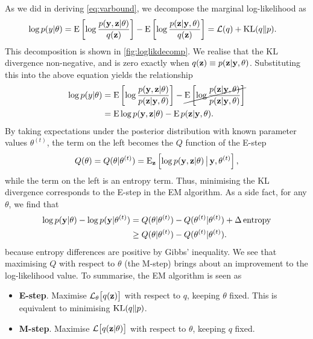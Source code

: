 As we did in deriving \cref{eq:varbound}, we decompose the marginal log-likelihood as
\begin{align*}
  \log p(y|\theta) 
  &= \operatorname{E} \left[\log \frac{p({\mathbf y},{\mathbf z}|\theta)}{q({\mathbf z})} \right] - \operatorname{E} \left[\log \frac{p({\mathbf z}|{\mathbf y},\theta)}{q({\mathbf z})} \right]  = {\mathcal L}(q) + \operatorname{KL}(q\Vert p).
\end{align*}
This decomposition is shown in \cref{fig:loglikdecomp}.
We realise that the KL divergence non-negative, and is zero exactly when $q({\mathbf z}) \equiv p({\mathbf z}|{\mathbf y},\theta)$.
Substituting this into the above equation yields the relationship
\begin{align*}
  \log p(y|\theta) 
  &= \operatorname{E} \left[\log \frac{p({\mathbf y},{\mathbf z}|\theta)}{p({\mathbf z}|{\mathbf y},\theta)} \right] 
  - \cancel{\operatorname{E} \left[\log \frac{p({\mathbf z}|{\mathbf y},\theta)}{p({\mathbf z}|{\mathbf y},\theta)} \right]}  \\
  &= \operatorname{E} \log p({\mathbf y},{\mathbf z}|\theta) - \operatorname{E} p({\mathbf z}|{\mathbf y},\theta).
\end{align*}
By taking expectations under the posterior distribution with known parameter values $\theta^{(t)}$, the term on the left becomes the $Q$ function of the E-step
\[
  Q(\theta) = Q(\theta|\theta^{(t)}) = \operatorname{E}_{\mathbf z}\left[ \log p({\mathbf y},{\mathbf z}|\theta) \,\big|\, {\mathbf y},\theta^{(t)} \right],
\]
while the term on the left is an entropy term.
Thus, minimising the KL divergence corresponds to the E-step in the EM algorithm.
As a side fact, for any $\theta$, we find that
\begin{align*}
  \log p({\mathbf y}|\theta) - \log p({\mathbf y}|\theta^{(t)}) 
  &= Q(\theta|\theta^{(t)}) - Q(\theta^{(t)}|\theta^{(t)}) + \Delta \, \text{entropy} \\
  &\geq Q(\theta|\theta^{(t)}) - Q(\theta^{(t)}|\theta^{(t)}).
\end{align*}
because entropy differences are positive by Gibbs' inequality.
We see that maximising $Q$ with respect to $\theta$ (the M-step) brings about an improvement to the log-likelihood value.
To summarise, the EM algorithm is seen as
\begin{itemize}
  \item \textbf{E-step}. Maximise ${\mathcal L}_\theta\big[q({\mathbf z})\big]$ with respect to $q$, keeping $\theta$ fixed. This is equivalent to minimising $\operatorname{KL}(q\Vert p)$.
  \item \textbf{M-step}. Maximise ${\mathcal L}\big[q({\mathbf z}|\theta)\big]$ with respect to $\theta$, keeping $q$ fixed. 
\end{itemize}

